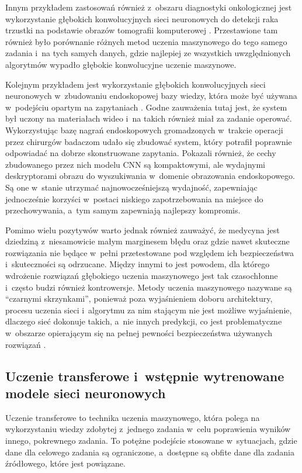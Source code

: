 {Innym przykładem zastosowań również z~obszaru diagnostyki onkologicznej jest wykorzystanie głębokich konwolucyjnych sieci neuronowych do detekcji raka trzustki na podstawie obrazów tomografii komputerowej \cite{sekaran2020deep}.
Przestawione tam również było porównanie różnych metod uczenia maszynowego do tego samego zadania i~na tych samych danych, gdzie najlepiej ze wszystkich uwzględnionych algorytmów wypadło głębokie konwolucyjne uczenie maszynowe.

Kolejnym przykładem jest wykorzystanie głębokich konwolucyjnych sieci neuronowych w~zbudowaniu endoskopowej bazy wiedzy, która może być używana w~podejściu opartym na zapytaniach \cite{petscharnig2018binary}.
Godne zauważenia tutaj jest, że system był uczony na materiałach wideo i~na takich również miał za zadanie operować.
Wykorzystując bazę nagrań endoskopowych gromadzonych w~trakcie operacji przez chirurgów badaczom udało się zbudować system, który potrafił poprawnie odpowiadać na dobrze skonstruowane zapytania.
Pokazali również, że cechy zbudowanego przez nich modelu CNN są kompaktowymi, ale wydajnymi deskryptorami obrazu do wyszukiwania w~domenie obrazowania endoskopowego.
Są one w~stanie utrzymać najnowocześniejszą wydajność, zapewniając jednocześnie korzyści w~postaci niskiego zapotrzebowania na miejsce do przechowywania, a~tym samym zapewniają najlepszy kompromis.

Pomimo wielu pozytywów warto jednak również zauważyć, że medycyna jest dziedziną z~niesamowicie małym marginesem błędu oraz gdzie nawet skuteczne rozwiązania nie będące w~pełni przetestowane pod względem ich bezpieczeństwa i~skuteczności są odrzucane.
Między innymi to jest powodem, dla którego wdrożenie rozwiązań głębokiego uczenia maszynowego jest tak czasochłonne i~często budzi również kontrowersje.
Metody uczenia maszynowego nazywane są ``czarnymi skrzynkami'', ponieważ poza wyjaśnieniem doboru architektury, procesu uczenia sieci i~algorytmu za nim stającym nie jest możliwe wyjaśnienie, dlaczego sieć dokonuje takich, a~nie innych predykcji, co jest problematyczne w~obszarze opierającym się na pełnej pewności bezpieczeństwa używanych rozwiązań \cite{pouyanfar2018survey}.

\subsection{Uczenie transferowe i~wstępnie wytrenowane modele sieci neuronowych}
\label{sec:transfer-learning}

Uczenie transferowe to technika uczenia maszynowego, która polega na wykorzystaniu wiedzy zdobytej z~jednego zadania w~celu poprawienia wyników innego, pokrewnego zadania.
To potężne podejście stosowane w~sytuacjach, gdzie dane dla celowego zadania są ograniczone, a~dostępne są obfite dane dla zadania źródłowego, które jest powiązane.

}
